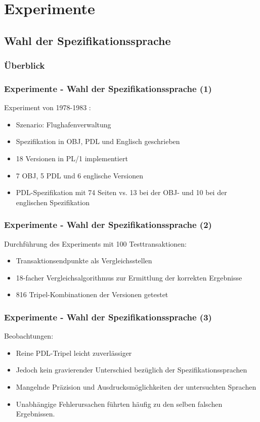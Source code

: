 \section{Experimente}
%
\subsection{Wahl der Spezifikationssprache}
%
%
\begin{frame}
	\frametitle{Überblick}
	\tableofcontents[currentsubsection]
\end{frame}
%
\begin{frame}
	\frametitle{Experimente - Wahl der Spezifikationssprache (1)}
	Experiment von 1978-1983 \cite{Avizienis:1984:FTD:1319725.1320045}:
	\begin{itemize}
		\item Szenario: Flughafenverwaltung
		\item Spezifikation in OBJ, PDL und Englisch geschrieben
		\item 18 Versionen in PL/1 implementiert
		\item 7 OBJ, 5 PDL und 6 englische Versionen
		\item PDL-Spezifikation mit 74 Seiten vs. 13 bei der OBJ- und 10 bei der englischen Spezifikation
	\end{itemize}
	
\end{frame}
%
%
\begin{frame}
	\frametitle{Experimente - Wahl der Spezifikationssprache (2)}
	Durchführung des Experiments mit 100 Testtransaktionen:
	\begin{itemize}
		\item Transaktionsendpunkte als Vergleichsstellen
		\item 18-facher Vergleichsalgorithmus zur Ermittlung der korrekten Ergebnisse
		\item 816 Tripel-Kombinationen der Versionen getestet
	\end{itemize}	
\end{frame}
%
%
\begin{frame}
	\frametitle{Experimente - Wahl der Spezifikationssprache (3)}
	Beobachtungen:
	\begin{itemize}
	\item Reine PDL-Tripel leicht zuverlässiger
	\item Jedoch kein gravierender Unterschied bezüglich der Spezifikationssprachen
	\item Mangelnde Präzision und Ausdrucksmöglichkeiten der untersuchten Sprachen
	\item Unabhängige Fehlerursachen führten häufig zu den selben falschen Ergebnissen.
	\end{itemize}	
\end{frame}
%
%
